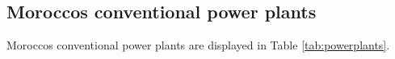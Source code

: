 

\subsection{Moroccos conventional power plants}
Moroccos conventional power plants are displayed in Table \ref{tab:powerplants}.

\clearpage
\begin{footnotesize}
    
\end{footnotesize}
\clearpage